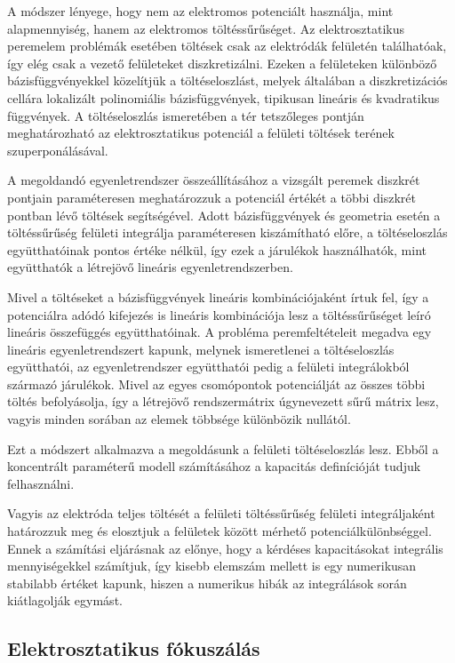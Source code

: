 A módszer lényege, hogy nem az elektromos potenciált használja, mint alapmennyiség, hanem az elektromos töltéssűrűséget. Az elektrosztatikus peremelem problémák esetében töltések csak az elektródák felületén találhatóak, így elég csak a vezető felületeket diszkretizálni. Ezeken a felületeken különböző bázisfüggvényekkel közelítjük a töltéseloszlást, melyek általában a diszkretizációs cellára lokalizált polinomiális bázisfüggvények, tipikusan lineáris és kvadratikus függvények. A töltéseloszlás ismeretében a tér tetszőleges pontján meghatározható az elektrosztatikus potenciál a felületi töltések terének szuperponálásával.

A megoldandó egyenletrendszer összeállításához a vizsgált peremek diszkrét pontjain paraméteresen meghatározzuk a potenciál értékét a többi diszkrét pontban lévő töltések segítségével. Adott bázisfüggvények és geometria esetén a töltéssűrűség felületi integrálja paraméteresen kiszámítható előre, a töltéseloszlás együtthatóinak pontos értéke nélkül, így ezek a járulékok használhatók, mint együtthatók a létrejövő lineáris egyenletrendszerben.

Mivel a töltéseket a bázisfüggvények lineáris kombinációjaként írtuk fel, így a potenciálra adódó kifejezés is lineáris kombinációja lesz a töltéssűrűséget leíró lineáris összefüggés együtthatóinak. A probléma peremfeltételeit megadva egy lineáris egyenletrendszert kapunk, melynek ismeretlenei a töltéseloszlás együtthatói, az egyenletrendszer együtthatói pedig a felületi integrálokból származó járulékok. Mivel az egyes csomópontok potenciálját az összes többi töltés befolyásolja, így a létrejövő rendszermátrix úgynevezett sűrű mátrix lesz, vagyis minden sorában az elemek többsége különbözik nullától.

Ezt a módszert alkalmazva a megoldásunk a felületi töltéseloszlás lesz. Ebből a koncentrált paraméterű modell számításához a kapacitás definícióját tudjuk felhasználni.


Vagyis az elektróda teljes töltését a felületi töltéssűrűség felületi integráljaként határozzuk meg és elosztjuk a felületek között mérhető potenciálkülönbséggel. Ennek a számítási eljárásnak az előnye, hogy a kérdéses kapacitásokat integrális mennyiségekkel számítjuk, így kisebb elemszám mellett is egy numerikusan stabilabb értéket kapunk, hiszen a numerikus hibák az integrálások során kiátlagolják egymást.

\subsection{Elektrosztatikus fókuszálás}
\label{sec:focusing}

